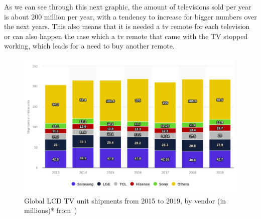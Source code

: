 As we can see through this next graphic, the amount of televisions sold per year is about 200 million per year, with a tendency to increase for bigger numbers over the next years. This also means that it is needed a tv remote for each television or can also happen the case which a tv remote that came with the TV stopped working, which leads for a need to buy another remote.

\begin{figure}
\centering
    \includegraphics[width=0.9\columnwidth]{./img/tvsellings.png}
  \caption{Global LCD TV unit shipments from 2015 to 2019, by vendor (in millions)* from~\cite{tvsellings})}%
\label{fig:tvsells}
\end{figure}
%
